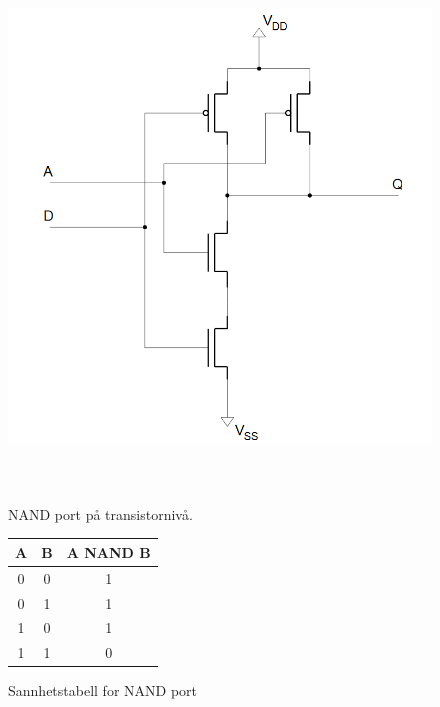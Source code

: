     \begin{figure}[!t]
        \centering
        \includegraphics[height=12cm]{figurer/NAND_transistorlevel.png}
        \caption{NAND port på transistornivå.}
        \label{fig:NAND_transistorlevel}
        ~\cite{Labhefte}
    \end{figure}

    \begin{figure}[!t]
        \centering
        \caption{Sannhetstabell for NAND port}
        \label{fig:tt_nand}
        \begin{tabular}{|c|c|c|}
            \hline
            \textbf{A} & \textbf{B} & \textbf{A NAND B} \\ \hline
            0 & 0 & 1 \\
            0 & 1 & 1 \\
            1 & 0 & 1 \\
            1 & 1 & 0 \\ \hline
        \end{tabular}
    \end{figure}


